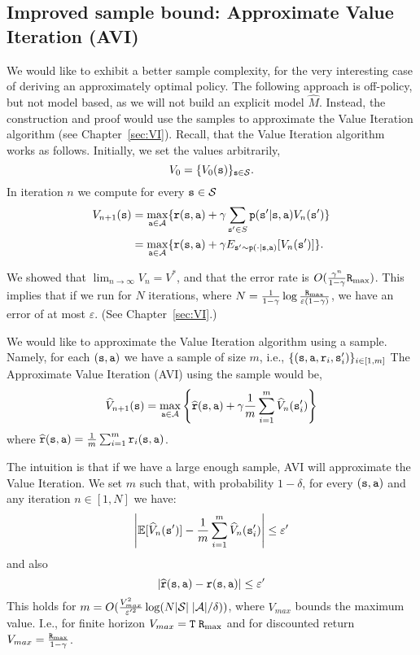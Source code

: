 \subsection{Improved sample bound: Approximate Value
Iteration (AVI)}

We would like to exhibit a better sample complexity, for the very
interesting case of deriving an approximately optimal policy. The following approach is off-policy, but not model based, as we will not build an explicit model $\widehat{M}$.
Instead, the
construction and proof would use the samples to approximate the Value Iteration algorithm (see
Chapter~\ref{sec:VI}).
%
Recall, that the Value Iteration algorithm works as follows.
Initially, we set the values arbitrarily,
\[
V_0=\{V_0({\tt s})\}_{{\tt s} \in \mathcal{S}}.
\]
In iteration $n$ we compute for every ${\tt s} \in \mathcal{S}$
\begin{align*}
V_{n+1}({\tt s})&=\max_{{\tt a}\in \mathcal{A}} \{
{\tt r}({\tt s},{\tt a})+\gamma \sum_{{\tt s}'\in S}
{\tt p}({\tt s}'|{\tt s},{\tt a})
V_n({\tt s}')\}\\
&=\max_{{\tt a}\in \mathcal{A}} \{ {\tt r}({\tt s},{\tt a})+\gamma
E_{{\tt s}'\sim {\tt p}(\cdot |{\tt s},{\tt a})} [V_n({\tt s}')]\}.
\end{align*}

We showed that $\lim_{n\rightarrow \infty}V_n =V^*$, and that the
error rate is $O(\frac{\gamma^n}{1-\gamma}{\tt R}_{\max })$.
%
This implies that if we run for $N$ iterations, where
$N=\frac{1}{1-\gamma}\log
\frac{{\tt R}_{\max }}{\varepsilon(1-\gamma)}$, we have an error of at most
$\varepsilon$. (See Chapter~\ref{sec:VI}.)


We would like to approximate the Value Iteration algorithm using a
sample. Namely, for each $({\tt s},{\tt a})$ we have a sample of size
$m$, i.e., $\{({\tt s},{\tt a},{\tt r}_i,{\tt s}'_i)\}_{i\in[1,m]}$
The Approximate Value Iteration (AVI) using the sample would be,
\[
\widehat{V}_{n+1}({\tt s})=\max_{{\tt a}\in \mathcal{A}} \left\{
\widehat{{\tt r}}({\tt s},{\tt a})+\gamma \frac{1}{m}\sum_{i=1}^m
\widehat{V}_n({\tt s}'_i)\right\}
\]
where $\widehat{{\tt r}}({\tt s},{\tt a})=\frac{1}{m}\sum_{i=1}^m {\tt r}_i({\tt s},{\tt a})$.

The intuition is that if we have a large enough sample, AVI  will
approximate the Value Iteration. We set $m$ such that, with
probability $1-\delta$, for every $({\tt s},{\tt a})$ and any
iteration $n\in[1,N]$ we have:
\[
\left|\mathbb{E}[\widehat{V}_n({\tt s}')]-\frac{1}{m}\sum_{i=1}^m
\widehat{V}_n({\tt s}'_i)\right|\leq \varepsilon'
\]
and also
\[
\left|\widehat{{\tt r}}({\tt s},{\tt a})-{\tt r}({\tt s},{\tt a})\right|\leq\varepsilon'
\]
This holds for $m=O(\frac{V^2_{max}}{\varepsilon'^2}\log (N
|\mathcal{S}|\;|\mathcal{A}|/\delta))$, where $V_{max}$ bounds the maximum
value. I.e., for finite horizon $V_{max}={\tt T}\; {\tt R}_{\max }$ and for
discounted return $V_{max}=\frac{{\tt R}_{\max }}{1-\gamma}$.


